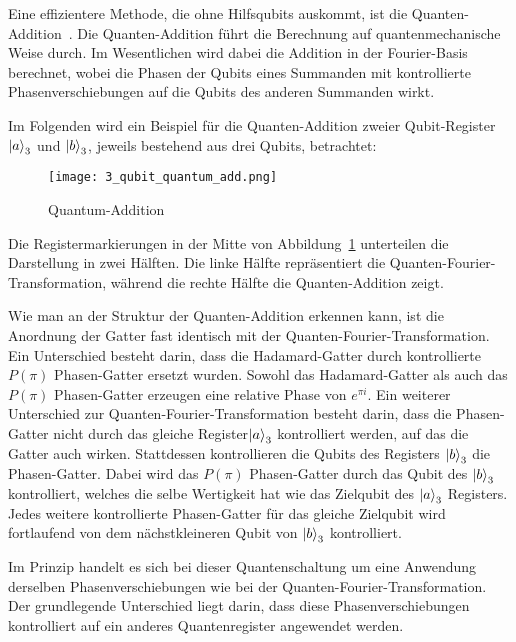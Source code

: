 Eine effizientere Methode, die ohne Hilfsqubits auskommt, ist die Quanten-Addition~\cite{draper2000addition}. 
Die Quanten-Addition führt die Berechnung auf quantenmechanische Weise durch. 
Im Wesentlichen wird dabei die Addition in der Fourier-Basis berechnet, 
wobei die Phasen der Qubits eines Summanden mit kontrollierte Phasenverschiebungen auf die Qubits des anderen Summanden wirkt.

Im Folgenden wird ein Beispiel für die Quanten-Addition zweier Qubit-Register \(\ket{a}_3\) und \(\ket{b}_3\), 
jeweils bestehend aus drei Qubits, betrachtet:
\begin{figure}[H]
    \caption{Quantum-Addition}
    \label{fig:3_qubit_quantum_add}
    \texttt{[image: 3\_qubit\_quantum\_add.png]}
    \centering
    \end{figure}
Die Registermarkierungen in der Mitte von Abbildung~\ref*{fig:3_qubit_quantum_add} unterteilen die Darstellung in zwei Hälften.
Die linke Hälfte repräsentiert die Quanten-Fourier-Transformation, 
während die rechte Hälfte die Quanten-Addition zeigt.

Wie man an der Struktur der Quanten-Addition erkennen kann,
ist die Anordnung der Gatter fast identisch mit der Quanten-Fourier-Transformation.
Ein Unterschied besteht darin, 
dass die Hadamard-Gatter durch kontrollierte \(P(\pi)\) Phasen-Gatter ersetzt wurden.
Sowohl das Hadamard-Gatter als auch das \(P(\pi)\) Phasen-Gatter erzeugen eine relative Phase von \(e^{\pi i}\).
Ein weiterer Unterschied zur Quanten-Fourier-Transformation besteht darin, 
dass die Phasen-Gatter nicht durch das gleiche Register\(\ket{a}_3\) kontrolliert werden, 
auf das die Gatter auch wirken.
Stattdessen kontrollieren die Qubits des Registers \(\ket{b}_3\) die Phasen-Gatter.
Dabei wird das \(P(\pi)\) Phasen-Gatter durch das Qubit des \(\ket{b}_3\) kontrolliert,
welches die selbe Wertigkeit hat wie das Zielqubit des \(\ket{a}_3\) Registers.
Jedes weitere kontrollierte Phasen-Gatter für das gleiche Zielqubit 
wird fortlaufend von dem nächstkleineren Qubit von \(\ket{b}_3\) kontrolliert.

Im Prinzip handelt es sich bei dieser Quantenschaltung um eine Anwendung derselben Phasenverschiebungen 
wie bei der Quanten-Fourier-Transformation. 
Der grundlegende Unterschied liegt darin, 
dass diese Phasenverschiebungen kontrolliert auf ein anderes Quantenregister angewendet werden.

